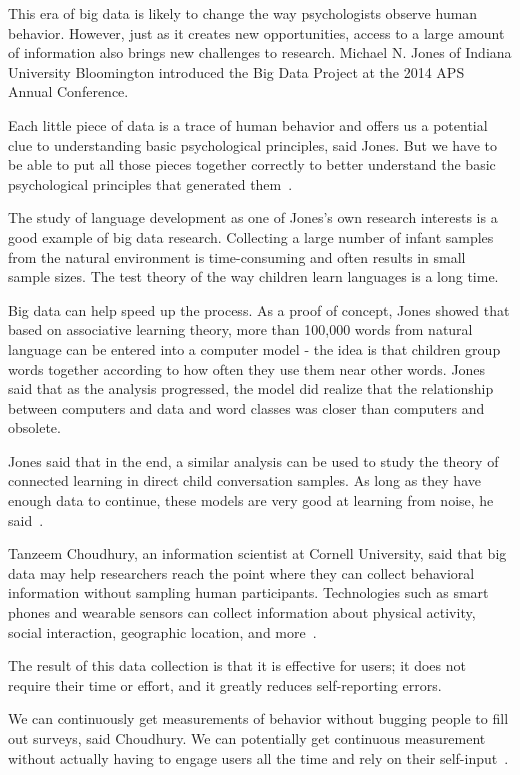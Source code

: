 This era of big data is likely to change the way psychologists observe 
human behavior. However, just as it creates new opportunities, access 
to a large amount of information also brings new challenges to research. 
Michael N. Jones of Indiana University Bloomington introduced the 
Big Data Project at the 2014 APS Annual Conference.

Each little piece of data is a trace of human behavior and offers 
us a potential clue to understanding basic psychological principles, 
said Jones. But we have to be able to put all those pieces together 
correctly to better understand the basic psychological principles 
that generated them~\cite{editor00}.

The study of language development as one of Jones's own research interests 
is a good example of big data research. Collecting a large number of infant
samples from the natural environment is time-consuming and often results 
in small sample sizes. The test theory of the way children learn 
languages is a long time.

Big data can help speed up the process. As a proof of concept, Jones 
showed that based on associative learning theory, more than 100,000 
words from natural language can be entered into a computer model - the 
idea is that children group words together according to how often 
they use them near other words. Jones said that as the analysis progressed, 
the model did realize that the relationship between computers and data 
and word classes was closer than computers and obsolete.

Jones said that in the end, a similar analysis can be used to study 
the theory of connected learning in direct child conversation samples. 
As long as they have enough data to continue, these models are very 
good at learning from noise, he said~\cite{editor00}.

Tanzeem Choudhury, an information scientist at Cornell University, 
said that big data may help researchers reach the point where they 
can collect behavioral information without sampling human participants. 
Technologies such as smart phones and wearable sensors can collect 
information about physical activity, social interaction, geographic 
location, and more~\cite{editor00}.

The result of this data collection is that it is effective for users; 
it does not require their time or effort, and it greatly reduces 
self-reporting errors.

We can continuously get measurements of behavior without bugging 
people to fill out surveys, said Choudhury. We can potentially get 
continuous measurement without actually having to engage users all 
the time and rely on their self-input~\cite{editor00}.

